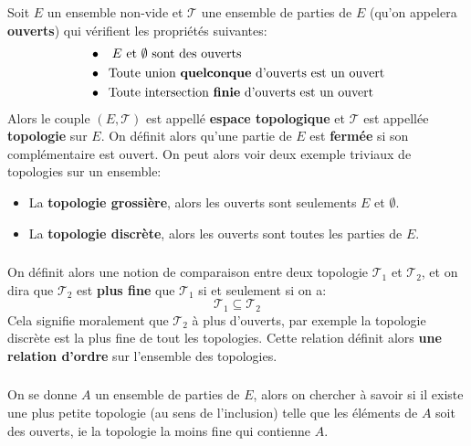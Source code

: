 \chapter*{}

Soit \(E\) un ensemble non-vide et \(\mathcal{T}\) une ensemble de parties de \(E\) (qu'on appelera \textbf{ouverts}) qui vérifient les propriétés suivantes:
\begin{align*}
   &\bullet \;\;\; \text{\(E\) et \(\emptyset\) sont des ouverts} \\
   &\bullet \;\; \text{Toute union \textbf{quelconque} d'ouverts est un ouvert} \\
   &\bullet \;\; \text{Toute intersection \textbf{finie} d'ouverts est un ouvert}
\end{align*}
Alors le couple \((E, \mathcal{T})\) est appellé \textbf{espace topologique} et \(\mathcal{T}\) est appellée \textbf{topologie} sur \(E\). On définit alors qu'une partie de \(E\) est \textbf{fermée} si son complémentaire est ouvert. On peut alors voir deux exemple triviaux de topologies sur un ensemble:
\begin{itemize}
   \item La \textbf{topologie grossière}, alors les ouverts sont seulements \(E\) et \(\emptyset\).
   \item La \textbf{topologie discrète}, alors les ouverts sont toutes les parties de \(E\).
\end{itemize}
\subsection*{}
On définit alors une notion de comparaison entre deux topologie \(\mathcal{T}_1\) et \(\mathcal{T}_2\), et on dira que \(\mathcal{T}_2\) est \textbf{plus fine} que \(\mathcal{T}_1\) si et seulement si on a:
\[
   \mathcal{T}_1 \subseteq \mathcal{T}_2
\]
Cela signifie moralement que \(\mathcal{T}_2\) à plus d'ouverts, par exemple la topologie discrète est la plus fine de tout les topologies. Cette relation définit alors \textbf{une relation d'ordre} sur l'ensemble des topologies.
\subsection*{}
On se donne \(A\) un ensemble de parties de \(E\), alors on chercher à savoir si il existe une plus petite topologie (au sens de l'inclusion) telle que les éléments de \(A\) soit des ouverts, ie la topologie la moins fine qui contienne \(A\).\<

